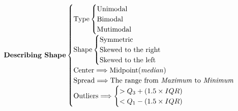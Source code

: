 \documentclass[Main.tex]{subfiles}
\begin{document}
	\begin{example} \hfill \\
	\begin{subequations}
		\begin{align}
			\textbf{Describing Shape}
			\begin{cases}
			\text{Type}
				\begin{cases}
					\text{Unimodal}\\
					\text{Bimodal}\\
					\text{Mutimodal}
				\end{cases}\\
			\text{Shape}
				\begin{cases}
					\text{Symmetric}\\
					\text{Skewed to the right}\\
					\text{Skewed to the left}\\	
				\end{cases}\\
			\text{Center}\Longrightarrow \text{Midpoint(\emph{median})}\\
			\text{Spread}\Longrightarrow \text{The range from \emph{Maximum} to \emph{Minimum}}\\
			\text{Outliers}\Longrightarrow
				\begin{cases}
					>Q_{3}+(1.5\times IQR)\\
					<Q_{1}-(1.5\times IQR)
				\end{cases}
			\end{cases}
		\end{align}
	\end{subequations}
	\end{example}
\end{document}
